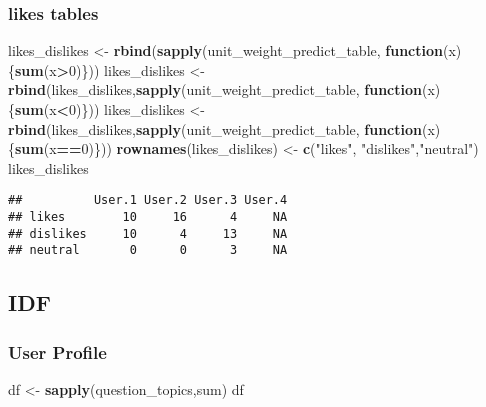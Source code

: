 \documentclass[]{article}
\newenvironment{Shaded}{\begin{snugshade}}{\end{snugshade}}
\newcommand{\ControlFlowTok}[1]{\textcolor[rgb]{0.13,0.29,0.53}{\textbf{#1}}}
\newcommand{\DecValTok}[1]{\textcolor[rgb]{0.00,0.00,0.81}{#1}}
\newcommand{\KeywordTok}[1]{\textcolor[rgb]{0.13,0.29,0.53}{\textbf{#1}}}
\newcommand{\NormalTok}[1]{#1}
\newcommand{\OperatorTok}[1]{\textcolor[rgb]{0.81,0.36,0.00}{\textbf{#1}}}
\newcommand{\StringTok}[1]{\textcolor[rgb]{0.31,0.60,0.02}{#1}}
\begin{document}
\hypertarget{likes-tables-1}{%
\subsubsection{likes tables}\label{likes-tables-1}}

\begin{Shaded}
\begin{Highlighting}[]
\NormalTok{likes_dislikes <-}\StringTok{ }\KeywordTok{rbind}\NormalTok{(}\KeywordTok{sapply}\NormalTok{(unit_weight_predict_table, }\ControlFlowTok{function}\NormalTok{(x)\{}\KeywordTok{sum}\NormalTok{(x}\OperatorTok{>}\DecValTok{0}\NormalTok{)\}))}
\NormalTok{likes_dislikes <-}\StringTok{ }\KeywordTok{rbind}\NormalTok{(likes_dislikes,}\KeywordTok{sapply}\NormalTok{(unit_weight_predict_table, }\ControlFlowTok{function}\NormalTok{(x)\{}\KeywordTok{sum}\NormalTok{(x}\OperatorTok{<}\DecValTok{0}\NormalTok{)\}))}
\NormalTok{likes_dislikes <-}\StringTok{ }\KeywordTok{rbind}\NormalTok{(likes_dislikes,}\KeywordTok{sapply}\NormalTok{(unit_weight_predict_table, }\ControlFlowTok{function}\NormalTok{(x)\{}\KeywordTok{sum}\NormalTok{(x}\OperatorTok{==}\DecValTok{0}\NormalTok{)\}))}
\KeywordTok{rownames}\NormalTok{(likes_dislikes) <-}\StringTok{ }\KeywordTok{c}\NormalTok{(}\StringTok{"likes"}\NormalTok{, }\StringTok{"dislikes"}\NormalTok{,}\StringTok{"neutral"}\NormalTok{)}
\NormalTok{likes_dislikes}
\end{Highlighting}
\end{Shaded}

\begin{verbatim}
##          User.1 User.2 User.3 User.4
## likes        10     16      4     NA
## dislikes     10      4     13     NA
## neutral       0      0      3     NA
\end{verbatim}

\hypertarget{idf}{%
\subsection{IDF}\label{idf}}

\hypertarget{user-profile-2}{%
\subsubsection{User Profile}\label{user-profile-2}}

\begin{Shaded}
\begin{Highlighting}[]
\NormalTok{df <-}\StringTok{ }\KeywordTok{sapply}\NormalTok{(question_topics,sum)}
\NormalTok{df}
\end{Highlighting}
\end{Shaded}
\end{document}
